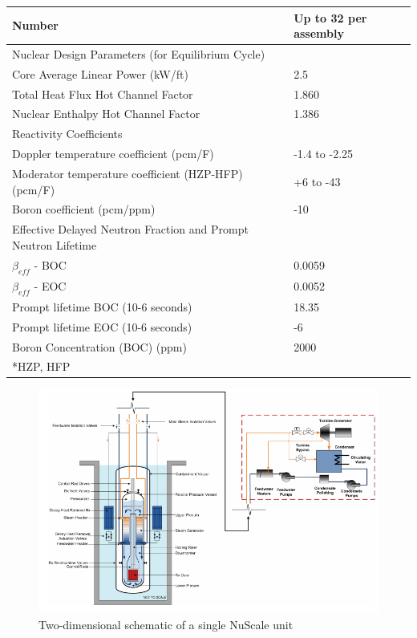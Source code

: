 \begin{table} [htbp]
\begin{center}
\begin{tabular}{l     l}
Number &Up to 32 per assembly\\
\hline 
Nuclear Design Parameters (for Equilibrium Cycle)\\
Core Average Linear Power (kW/ft)&2.5     \\
Total Heat Flux Hot Channel Factor&1.860  \\
Nuclear Enthalpy Hot Channel Factor&1.386  \\
\hline 
Reactivity Coefficients\\
Doppler temperature coefficient (pcm/F)&-1.4 to -2.25\\
Moderator temperature coefficient (HZP-HFP) (pcm/F)&+6 to -43     \\
Boron coefficient (pcm/ppm)&-10             \\
\hline 
Effective Delayed Neutron Fraction 
and Prompt Neutron Lifetime\\
$\beta_{eff}$ - \gls{BOC}&0.0059\\
$ \beta _{eff}$ - \gls{EOC}&0.0052\\
Prompt lifetime BOC (10-6 seconds)&18.35  \\
Prompt lifetime EOC (10-6 seconds)&-6       \\
\hline 
Boron Concentration (BOC) (ppm)&2000\\
\hline 
*\gls{HZP}, \gls{HFP}
\end{tabular}
\end{center}
\end{table}


\begin{figure}[htbp]
\centering
\includegraphics[scale=0.7]{Figs/nuscale2d.jpeg}
\caption{ Two-dimensional schematic of a single NuScale unit}
\label{Nu2d}
\end{figure}

